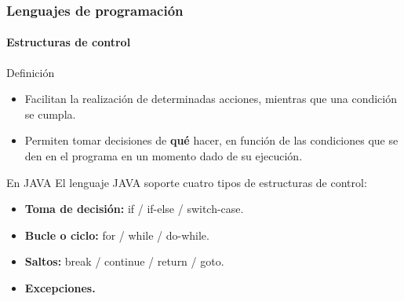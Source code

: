 \documentclass{beamer}
\begin{document}
\begin{frame}
  \frametitle{Lenguajes de programación}
  \framesubtitle{Estructuras de control}

  {\scriptsize
    \begin{block}{Definición}
      \begin{itemize}
      \item Facilitan la realización de determinadas acciones, mientras que una condición se cumpla. 
      \item Permiten tomar decisiones de \textbf{qué} hacer, en función de las condiciones que se den en el programa en un momento dado de su ejecución.
      \end{itemize}
    \end{block}
    \begin{exampleblock}{En JAVA}
      El lenguaje JAVA soporte cuatro tipos de estructuras de control:
      \begin{itemize}
      \item \textbf{Toma de decisión:} if / if-else / switch-case.
      \item \textbf{Bucle o ciclo:} for / while / do-while.
      \item \textbf{Saltos:} break / continue / return / goto.
      \item \textbf{Excepciones.}
      \end{itemize}
    \end{exampleblock}
  }
\end{frame}
\end{document}
